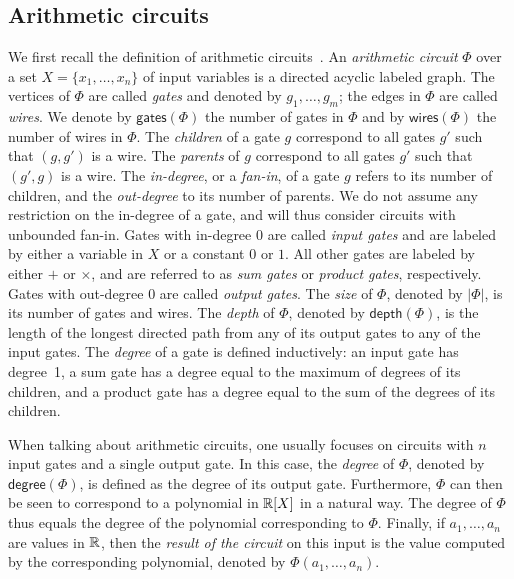 \subsection{Arithmetic circuits}\label{subsect:ac}
We first recall the definition of arithmetic circuits~\cite{allender}. 
%
An \textit{arithmetic circuit} $\Phi$ over a set $X=\{x_1,\ldots,x_n\}$ of input variables 
is a directed acyclic labeled graph. The vertices of $\Phi$ are called \textit{gates} and 
denoted by $g_1,\ldots,g_m$; the edges in $\Phi$ are called \textit{wires}. We denote by 
$\mathsf{gates}(\Phi)$ the number of gates in $\Phi$ and by $\mathsf{wires}(\Phi)$ the number
of wires in $\Phi$.
%
The \textit{children} of a gate $g$ correspond to all gates $g'$ such that $(g,g')$ is a wire. 
The \textit{parents} of $g$ correspond to all gates $g'$ such that $(g',g)$ is a wire. The
\textit{in-degree}, or a \textit{fan-in}, of a gate $g$ refers to its number of children, and 
the \textit{out-degree} to its number of parents. We do not assume any restriction on the 
in-degree of a gate, and will thus consider circuits with unbounded fan-in. 
Gates with in-degree $0$ are called \textit{input gates} and are labeled by either a variable 
in $X$ or a constant $0$ or $1$. All other gates are labeled by either $+$ or $\times$, and 
are referred to as \textit{sum gates} or \textit{product gates}, respectively.
Gates with out-degree $0$ are called \textit{output gates}.
The \textit{size} of $\Phi$, denoted by $|\Phi|$, is its number of gates and wires. 
%
The \textit{depth} of $\Phi$, denoted
by $\mathsf{depth}(\Phi)$, is the length of the longest directed path from any of its output 
gates to any of the input gates. The \textit{degree} of a gate is defined inductively: an input 
gate has degree~1, a sum gate has a degree equal to the maximum of degrees of its children, 
and a product gate has a degree equal to the sum of the degrees of its children. 

When talking about arithmetic circuits, one usually focuses on circuits with $n$ input gates and a single output gate. In this case, 
the \textit{degree} of $\Phi$, denoted by $\mathsf{degree}(\Phi)$, is defined as the degree of its output gate. Furthermore, 
$\Phi$ can then be seen to correspond to a polynomial in $\mathbb{R}[X]$ in a natural way. The {degree} of $\Phi$ thus equals 
the degree of the polynomial corresponding to $\Phi$. Finally, if $a_1,\ldots ,a_n$ are values in $\mathbb{R}$, then 
the \textit{result of the circuit} on this input is the value computed by the corresponding polynomial, denoted by $\Phi(a_1,\ldots ,a_n)$.

